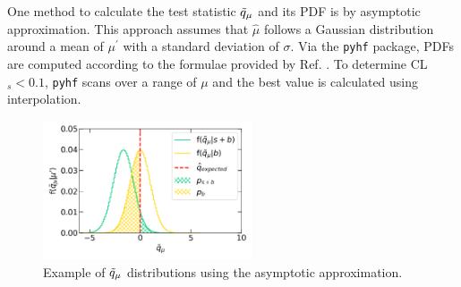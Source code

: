 
One method to calculate the test statistic $\Tilde{q}_\mu$ and its PDF is by asymptotic approximation.
This approach assumes that $\hat{\mu}$ follows a Gaussian distribution around a mean of $\mu^{\prime}$ with a standard deviation of $\sigma$.
Via the \texttt{pyhf} package, PDFs are computed according to the formulae provided by Ref. \cite{asymptotic_test}.
To determine CL$_s < 0.1$, \texttt{pyhf} scans over a range of $\mu$ and the best value is calculated using interpolation.

\begin{figure}[b!] 
\centering    
\includegraphics[width=0.55\textwidth]{asymtotic}
\caption[Distribution of Test Statistics Acquired from Asymptotic Approximation]{Example of $\Tilde{q}_\mu$ distributions using the asymptotic approximation.}
\label{fig:stat_asymptotic}
\end{figure}

